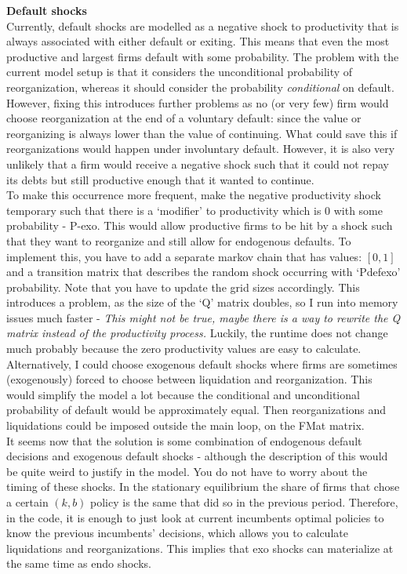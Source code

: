 \documentclass[12pt]{article}
\begin{document}
\textbf{Default shocks} \\
Currently, default shocks are modelled as a negative shock to productivity that is always associated with either default or exiting. This means that even the most productive and largest firms default with some probability. The problem with the current model setup is that it considers the unconditional probability of reorganization, whereas it should consider the probability \textit{conditional} on default. However, fixing this introduces further problems as no (or very few) firm would choose reorganization at the end of a voluntary default: since the value or reorganizing is always lower than the value of continuing. What could save this if reorganizations  would happen under involuntary default. However, it is also very unlikely that a firm would receive a negative shock such that it could not repay its debts but still productive enough that it wanted to continue. \vspace{3mm} \\ 
To make this occurrence more frequent, make the negative productivity shock temporary such that there is a `modifier' to productivity which is 0 with some probability - P-exo. This would allow productive firms to be hit by a shock such that they want to reorganize and still allow for endogenous defaults. To implement this, you have to add a separate markov chain that has values: $[0,1]$ and a transition matrix that describes the random shock occurring with `Pdefexo' probability.  Note that you have to update the grid sizes accordingly. This introduces a problem, as the size of the `Q' matrix doubles, so I run into memory issues much faster - \textit{This might not be true, maybe there is a way to rewrite the Q matrix instead of the productivity process.} Luckily, the runtime does not change much probably because the zero productivity values are easy to calculate.  \vspace{3mm} \\
Alternatively, I could choose exogenous default shocks where firms are sometimes (exogenously) forced to choose between liquidation and reorganization. This would simplify the model a lot because the conditional and unconditional probability of default would be approximately equal. Then reorganizations and liquidations could be imposed outside the main loop, on the FMat matrix. \vspace{3mm} \\
It seems now that the solution is some combination of endogenous default decisions and exogenous default shocks - although the description of this would be quite weird to justify in the model. You do not have to worry about the timing of these shocks. In the stationary equilibrium the share of firms that chose a certain $(k,b)$ policy is the same that did so in the previous period. Therefore, in the code, it is enough to just look at current incumbents optimal policies to know the previous incumbents' decisions, which allows you to calculate liquidations and reorganizations. This implies that exo shocks can materialize at the same time as endo shocks.  \vspace{3mm} \\
\end{document}
